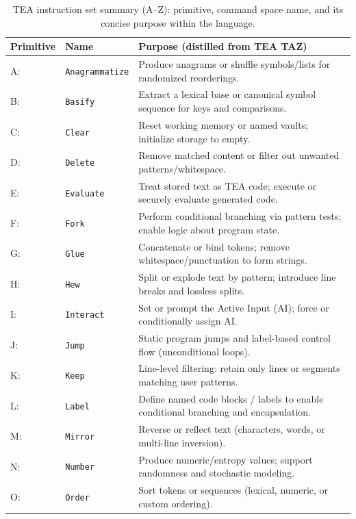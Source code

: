 \documentclass[sigplan,screen]{acmart}
\begin{document}
\begin{table}[ht]
  \centering
  \small
  \caption{TEA instruction set summary (A--Z): primitive, command space name, and its concise purpose within the language.}
  \label{tab:tea-az-minimal}
  \begin{tabular}{@{}p{} p{} p{}@{}}
    \toprule
    \textbf{Primitive} & \textbf{Name} & \textbf{Purpose (distilled from TEA TAZ)} \\
    \midrule
    A: & \texttt{Anagrammatize} & Produce anagrams or shuffle symbols/lists for randomized reorderings. \\
    B: & \texttt{Basify} & Extract a lexical base or canonical symbol sequence for keys and comparisons. \\
    C: & \texttt{Clear} & Reset working memory or named vaults; initialize storage to empty. \\
    D: & \texttt{Delete} & Remove matched content or filter out unwanted patterns/whitespace. \\
    E: & \texttt{Evaluate} & Treat stored text as TEA code; execute or securely evaluate generated code. \\
    F: & \texttt{Fork} & Perform conditional branching via pattern tests; enable logic about program state. \\
    G: & \texttt{Glue} & Concatenate or bind tokens; remove whitespace/punctuation to form strings. \\
    H: & \texttt{Hew} & Split or explode text by pattern; introduce line breaks and lossless splits. \\
    I: & \texttt{Interact} & Set or prompt the Active Input (AI); force or conditionally assign AI. \\
    J: & \texttt{Jump} & Static program jumps and label-based control flow (unconditional loops). \\
    K: & \texttt{Keep} & Line-level filtering: retain only lines or segments matching user patterns. \\
    L: & \texttt{Label} & Define named code blocks / labels to enable conditional branching and encapsulation. \\
    M: & \texttt{Mirror} & Reverse or reflect text (characters, words, or multi-line inversion). \\
    N: & \texttt{Number} & Produce numeric/entropy values; support randomness and stochastic modeling. \\
    O: & \texttt{Order} & Sort tokens or sequences (lexical, numeric, or custom ordering). \\

\end{tabular}
\end{table}
\end{document}
